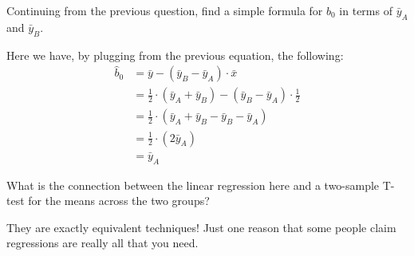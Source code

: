 
Continuing from the previous question, find a simple formula for $\widehat{b}_0$
in terms of $\bar{y}_A$ and $\bar{y}_B$.


Here we have, by plugging from the previous equation, the following:
\begin{align*}
\widehat{b}_0 &= \bar{y} - (\bar{y}_B - \bar{y}_A) \cdot \bar{x} \\
&= \frac{1}{2} \cdot (\bar{y}_A + \bar{y}_B) - (\bar{y}_B - \bar{y}_A) \cdot \frac{1}{2} \\
&= \frac{1}{2} \cdot (\bar{y}_A + \bar{y}_B - \bar{y}_B - \bar{y}_A) \\
&= \frac{1}{2} \cdot (2 \bar{y}_A) \\
&= \bar{y}_A
\end{align*}


What is the connection between the linear regression here and a two-sample T-test
for the means across the two groups?


They are exactly equivalent techniques! Just one reason that some people claim
regressions are really all that you need.